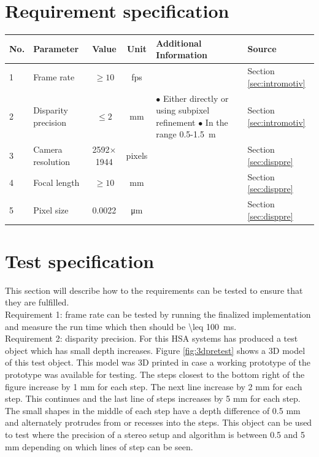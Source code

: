 \section{Requirement specification}
\begin{table}[ht!]
  \centering
  \begin{tabular}{l l c c p{4cm} p{2.5cm}}
  \toprule
  \textbf{No.} & \textbf{Parameter} & \textbf{Value} & \textbf{Unit} & \textbf{Additional Information} & \textbf{Source} \\
  \midrule
  1 & Frame rate & $\geq 10$ & fps & & Section \vref{sec:intromotiv} \\
  \midrule
  2 & Disparity precision & $\leq 2$ & mm & $\bullet$ Either directly or using subpixel refinement \newline $\bullet$ In the range 0.5-\SI{1.5}{\meter} & Section \vref{sec:intromotiv}\\
  \midrule
  3 & Camera resolution & 2592$\times$1944 & pixels & & Section \vref{sec:disppre} \\
  \midrule
  4 & Focal length & $\geq 10$ & mm & & Section \vref{sec:disppre} \\
  \midrule
  5 & Pixel size & 0.0022 & \si{\micro\meter} & & Section \vref{sec:disppre} \\  
  \bottomrule
  \end{tabular}
\end{table}
\section{Test specification}
This section will describe how to the requirements can be tested to ensure that they are fulfilled. \\

Requirement 1: frame rate can be tested by running the finalized implementation and measure the run time which then should be \SI{\leq 100}{\milli\second}. \\

Requirement 2: disparity precision. For this HSA systems has produced a test object which has small depth increases. Figure \vref{fig:3dpretest} shows a 3D model of this test object. This model was 3D printed in case a working prototype of the prototype was available for testing. The steps closest to the bottom right of the figure increase by 1 mm for each step. The next line increase by 2 mm for each step. This continues and the last line of steps increases by 5 mm for each step. The small shapes in the middle of each step have a depth difference of 0.5 mm and alternately protrudes from or recesses into the steps. This object can be used to test where the precision of a stereo setup and algorithm is between 0.5 and 5 mm depending on which lines of step can be seen. \\

